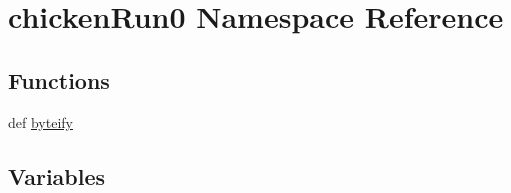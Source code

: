 \hypertarget{namespacechickenRun0}{\section{chicken\-Run0 Namespace Reference}
\label{namespacechickenRun0}
}
\subsection*{Functions}
\begin{DoxyCompactItemize}
\item 
def \hyperlink{namespacechickenRun0_abd898ac5f9a46a6ed157742ac067674a}{byteify}
\end{DoxyCompactItemize}
\subsection*{Variables}
